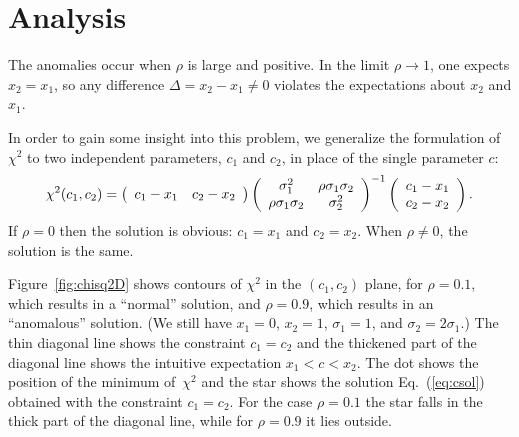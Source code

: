 \documentclass[11pt]{article}
\newcommand{\xa}   {x_1}
\newcommand{\xb}   {x_2}
\newcommand{\ua} {\sigma_{1}}
\newcommand{\ub} {\sigma_{2}}
\newcommand{\uaq} {\sigma^2_{1}}
\newcommand{\ubq} {\sigma^2_{2}}
\newcommand{\ca}{c_1}
\newcommand{\cb}{c_2}
\begin{document}
\section{Analysis}
\par
The anomalies occur when $\rho$ is large and positive.  In the limit $\rho \rightarrow 1$,
one expects $\xb = \xa$, so any difference $\Delta = \xb - \xa \ne 0$ violates the expectations
about $\xb$ and $\xa$.   
\par
In order to gain some insight into this problem, 
we generalize the formulation of~$\chi^2$ to two independent parameters,
$\ca$ and $\cb$, in place of the single parameter $c$:  
\begin{equation} \label{eq:chisqdef2}
 \chi^2(\ca,\cb) =
 \left( \begin{array}{cc} \ca-\xa & \cb-\xb \cr \end{array} \right)
  \left( \begin{array}{cc}
   \uaq & \rho\ua\ub \cr \rho\ua\ub & \ubq \cr
          \end{array} \right)^{-1}
 \left( \begin{array}{c} \ca - \xa \cr \cb - \xb \end{array} \right) .
\end{equation}
If $\rho = 0$ then the solution is obvious: $\ca = \xa$ and $\cb = \xb$.
When $\rho \ne 0$, the solution is the same. %
\par
Figure~\ref{fig:chisq2D} shows contours of $\chi^2$ in the $(\ca,\cb)$ plane,
for $\rho = 0.1$, which results in a ``normal'' solution, and
$\rho = 0.9$, which results in an ``anomalous'' solution.
(We still have $\xa = 0$, $\xb = 1$, $\ua = 1$, and $\ub = 2\ua$.)
The thin diagonal line shows the constraint $\ca = \cb$ and the
thickened part of the diagonal line shows the intuitive expectation
$\xa < c < \xb$.
The dot shows the position of the minimum of~$\chi^2$ and 
the star shows the solution Eq.~(\ref{eq:csol}) obtained with the
constraint $\ca = \cb$.   For the case $\rho = 0.1$ the star falls
in the thick part of the diagonal line, while for $\rho =  0.9$ it
lies outside.
\end{document}
